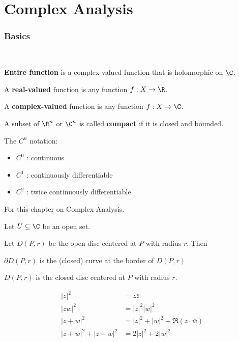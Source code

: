 \chapter{Complex Analysis}\label{f28d4dc}

\subsection{Basics}\label{b2a0add}

\label{d508dc8}

\textcolor{white}{.}

\textbf{Entire function} is a complex-valued function that is holomorphic on
$\C$.

A \textbf{real-valued} function is any function $f:X\to\R$.

A \textbf{complex-valued} function is any function $f:X\to\C$.

A subset of $\R^n$ or $\C^n$ is called \textbf{compact} if it is closed and
bounded.

The $C^n$ notation:
\begin{itemize}
  \item $C^0$ : continuous
  \item $C^1$ : continuously differentiable
  \item $C^2$ : twice continuously differentiable
\end{itemize}

\label{d1055b9}

For this chapter on Complex Analysis.

Let $U\subseteq\C$ be an open set.

Let $D(P,r)$ be the open disc centered at $P$ with radius $r$. Then
\begin{enumerati}
  \item $\partial D(P,r)$ is the (closed) curve at the border of $D(P,r)$
  \item $\overline D(P,r)$ is the closed disc centered at $P$ with
  radius $r$.
\end{enumerati}

\label{adebe9e}

\begin{align*}
  |z|^2           &=z\bar z                       \\
  |zw|^2          &=|z|^2|w|^2                    \\
  |z+w|^2         &=|z|^2+|w|^2+\Re(z\cdot\bar w) \\
  |z+w|^2+|z-w|^2 &=2|z|^2+2|w|^2
\end{align*}

